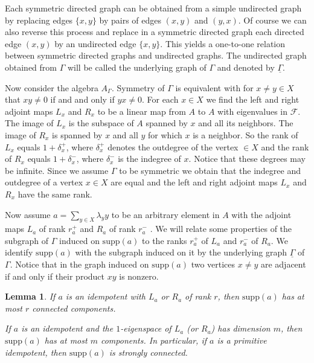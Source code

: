 \documentclass[oneside,a4paper]{amsart} %
\newtheorem{lemma}[proposition]{Lemma}
\theoremstyle{definition}
\begin{document}
Each symmetric directed graph can be obtained from a simple undirected graph 
by replacing edges $\{x,y\}$  by pairs of edges $(x,y)$ and $(y,x)$. 
Of course we can also reverse this process and replace in a symmetric directed graph each directed edge $(x,y)$ by an undirected edge $\{x,y\}$.
This yields a one-to-one relation between symmetric directed graphs and undirected graphs.   
The undirected graph obtained from $\Gamma$ will be called the underlying graph of $\Gamma$ and denoted by $\underline{\Gamma}$.



Now consider  the algebra $A_\Gamma$. Symmetry of $\Gamma$ is equivalent with for  $x\neq y\in X$ that  $xy\neq 0$ if and
and only if $yx\neq 0$.
For each $x\in X$ we find the left and right adjoint maps $L_x$ and $R_x$ to be a linear  map from $A$ to $A$ with eigenvalues in $\mathcal{F}$.
The image of  $L_x$ is the subspace of $A$ spanned by $x$ and all its neighbors.
The image of $R_x$ is spanned by $x$ and all $y$ for which $x$ is a neighbor. 
So the  rank of $L_x$ equals  $1+\delta^+_x$, where $\delta^+_x$ denotes the outdegree of the vertex $\in X$ and the rank of $R_x$
equals $1+\delta^-_x$, where $\delta^-_x$ is the indegree of $x$. Notice that these degrees may be infinite.
Since we assume $\Gamma$ to be symmetric we obtain that the indegree and outdegree of a vertex $x\in X$ are equal and the left and right adjoint maps $L_x$ and $R_x$
have the same rank.




Now assume $a=\displaystyle\sum_{y\in X} \lambda_y y$ to be an arbitrary element in $A$  with the adjoint maps $L_a$ of rank $r^+_a$
and $R_a$ of rank $r^-_a$ .
We will  relate some properties of the subgraph of $\Gamma$ induced on $\mathrm{supp}(a)$ to the ranks $r^+_a$ of $L_a$
and $r^-_a$ of $R_a$.
We identify $\mathrm{supp}(a)$ with the subgraph induced on it by the underlying graph $\underline{\Gamma}$ of $\Gamma$.
Notice that in the graph induced on $\mathrm{supp}(a)$ two vertices $x\neq y$ are adjacent if and only if their product $xy$ is nonzero.

\begin{lemma}\label{components}
If $a$ is an idempotent with $L_a$ or $R_a$ of rank $r$, then $\mathrm{supp}(a)$ has at most $r$ connected components.

If $a$ is an idempotent and the $1$-eigenspace of $L_a$ (or $R_a$) has dimension $m$, then $\mathrm{supp}(a)$ has at most $m$ components.
In particular, if $a$ is a primitive idempotent, then $\mathrm{supp}(a)$ is strongly connected.
\end{lemma}
\end{document}
